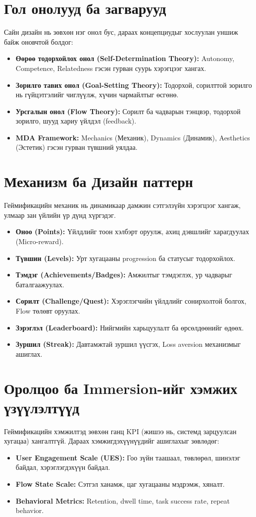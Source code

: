 \begin{sloppy}
\section*{Гол онолууд ба загварууд}
Сайн дизайн нь зөвхөн нэг онол бус, дараах концепциудыг хослуулан уншиж байж оновчтой болдог:
\begin{itemize}
    \item \textbf{Өөрөө тодорхойлох онол (Self-Determination Theory):} Autonomy, Competence, Relatedness гэсэн гурван суурь хэрэгцээг хангах.
    \item \textbf{Зорилго тавих онол (Goal-Setting Theory):} Тодорхой, сорилттой зорилго нь гүйцэтгэлийг чиглүүлж, хүчин чармайлтыг өсгөнө.
    \item \textbf{Урсгалын онол (Flow Theory):} Сорилт ба чадварын тэнцвэр, тодорхой зорилго, шууд хариу үйлдэл (feedback).
    \item \textbf{MDA Framework:} Mechanics (Механик), Dynamics (Динамик), Aesthetics (Эстетик) гэсэн гурван түвшний уялдаа.
\end{itemize}

\section*{Механизм ба Дизайн паттерн}
Геймификацийн механик нь динамикаар дамжин сэтгэлзүйн хэрэгцээг хангаж, улмаар зан үйлийн үр дүнд хүргэдэг.
\begin{itemize}
    \item \textbf{Оноо (Points):} Үйлдлийг тоон хэлбэрт оруулж, ахиц дэвшлийг харагдуулах (Micro-reward).
    \item \textbf{Түвшин (Levels):} Урт хугацааны progression ба статусыг тодорхойлох.
    \item \textbf{Тэмдэг (Achievements/Badges):} Амжилтыг тэмдэглэх, ур чадварыг баталгаажуулах.
    \item \textbf{Сорилт (Challenge/Quest):} Хэрэглэгчийн үйлдлийг сонирхолтой болгох, Flow төлөвт оруулах.
    \item \textbf{Зэрэглэл (Leaderboard):} Нийгмийн харьцуулалт ба өрсөлдөөнийг өдөөх.
    \item \textbf{Зуршил (Streak):} Давтамжтай зуршил үүсгэх, Loss aversion механизмыг ашиглах.
\end{itemize}

\section*{Оролцоо ба Immersion-ийг хэмжих үзүүлэлтүүд}
Геймификацийн хэмжилтэд зөвхөн ганц KPI (жишээ нь, системд зарцуулсан хугацаа) хангалтгүй. Дараах хэмжигдэхүүнүүдийг ашиглахыг зөвлөдөг:
\begin{itemize}
    \item \textbf{User Engagement Scale (UES):} Гоо зүйн таашаал, төвлөрөл, шинэлэг байдал, хэрэглэгдэхүүн байдал.
    \item \textbf{Flow State Scale:} Сэтгэл ханамж, цаг хугацааны мэдрэмж, хяналт.
    \item \textbf{Behavioral Metrics:} Retention, dwell time, task success rate, repeat behavior.
\end{itemize}


\end{sloppy}

